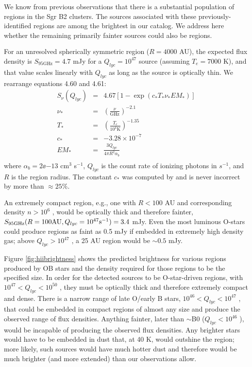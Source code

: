 \documentclass[twocolumn]{aastex61}
\begin{document}
We know from previous observations
\citep[e.g.][]{Mehringer1995b,de-Pree1996a,de-Pree2015a} that there is a
substantial population of \hii regions in the Sgr B2 clusters.  The \nhii
sources associated with these previously-identified \hii regions are among the
brightest in our catalog.  We address here whether the remaining primarily
fainter sources could also be \hii regions.

For an unresolved spherically symmetric \hii region ($R=4000$ AU), the expected
flux density is $S_{95 \mathrm{GHz}} = 4.7$ mJy for a $Q_{lyc}=10^{47}$ \pers
source (assuming $T_e=7000$ K), and that value scales linearly with $Q_{lyc}$
as long as the source is optically thin.   We rearrange \citet{Condon2007a}
equations 4.60 and 4.61:
\begin{eqnarray}
S_{\nu}(Q_{lyc})  &=& 4.67 \left[1-\exp\left(c_* T_* \nu_* EM_* \right) \right] \nonumber \\
\nu_* &=& \left(\frac{\nu}{\mathrm{GHz}}\right)^{-2.1} \nonumber \\
T_* &=& \left(\frac{T_e}{10^4 \mathrm{K}}\right)^{-1.35} \nonumber \\
c_* &=& -3.28\times10^{-7} \nonumber \\
EM_* &=& \frac{3 Q_{lyc}}{4 \pi R^2 \alpha_b} \nonumber \\
\end{eqnarray}
where $\alpha_b=2\ee{-13}$ cm$^3$ s$^{-1}$, $Q_{lyc}$ is the count rate
of ionizing photons in $s^{-1}$, and $R$ is the \hii region radius.
The constant $c_*$ was computed by \citet{Mezger1967a} and is never
incorrect by more than $\approx25\%$.

An extremely compact \hii region,
e.g., one with $R<100$ AU and corresponding density $n>10^6$ \percc, would be
optically thick and therefore fainter, $S_{95 \mathrm{GHz}}(R=100 \mathrm{AU},
Q_{lyc}=10^{47} \mathrm{s}^{-1})=3.4$ mJy.  Even the most luminous O-stars could produce \hii
regions as faint as 0.5 mJy if embedded in extremely high density gas; above
$Q_{lyc}>10^{47}$ \pers, a 25 AU \hii region would be $\sim0.5$ mJy.

Figure \ref{fig:hiibrightness} shows the predicted brightness for various \hii
regions produced by OB stars and the density required for those \hii regions
to be the specified size.  In
order for the detected sources to be O-star-driven \hii regions, with $10^{47}
< Q_{lyc} < 10^{50}$ \pers, they must be optically thick and therefore
extremely compact and dense.  There is a narrow range of late O/early B stars,
$10^{46} < Q_{lyc} < 10^{47}$ \pers, that could be embedded in compact \hii
regions of almost any size and produce the observed range of flux densities.
Anything fainter, later than $\sim$B0 ($Q_{lyc}<10^{46}$ \pers), would be
incapable of producing the observed flux densities.
Any brighter stars would have to be embedded in dust that, at 40 K, would
outshine the \hii region; more likely, such sources would have much hotter dust
and therefore would be much brighter (and more extended) than our observations
allow.
\end{document}
